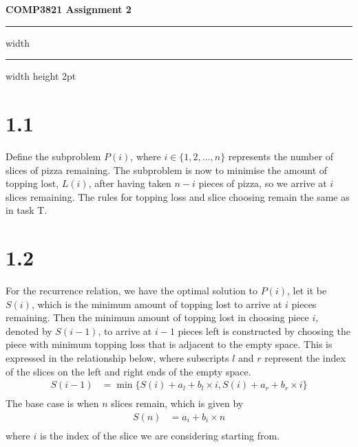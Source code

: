\documentclass[a4paper,11pt]{article}
\newcommand{\ds}{\displaystyle}
\begin{document}
\begin{center}
	\LARGE \textbf{COMP3821 Assignment 2}
	\vspace{2mm}
	\hrule width \hsize \kern 1mm \hrule width \hsize height 2pt
\end{center}


\section{1.1}
Define the subproblem $\ds{P(i)}$, where $\ds{i \in \{1,2,\dots,n\}}$ represents the number of slices of pizza remaining. The subproblem is now to minimise the amount of topping lost, $\ds{L(i)}$, after having taken $\ds{n-i}$ pieces of pizza, so we arrive at $\ds{i}$ slices remaining. The rules for topping loss and slice choosing remain the same as in task T. 

\section{1.2}
For the recurrence relation, we have the optimal solution to $\ds{P(i)}$, let it be $\ds{S(i)}$, which is the minimum amount of topping lost to arrive at $\ds{i}$ pieces remaining. Then the minimum amount of topping lost in choosing piece $\ds{i}$, denoted by $\ds{S(i-1)}$, to arrive at $\ds{i-1}$ pieces left is constructed by choosing the piece with minimum topping loss that is adjacent to the empty space. This is expressed in the relationship below, where subscripts $\ds{l}$ and $\ds{r}$ represent the index of the slices on the left and right ends of the empty space.
\begin{align*}
	S(i-1) & = \min\{S(i) + a_l + b_l\times i, S(i) + a_r + b_r\times i \}\\
\end{align*}
The base  case is when $\ds{n}$ slices remain, which is given by
\begin{align*}
	S(n) & = a_i + b_i \times n\\
\end{align*}
where $\ds{i}$ is the index of the slice we are considering starting from.
\end{document}
